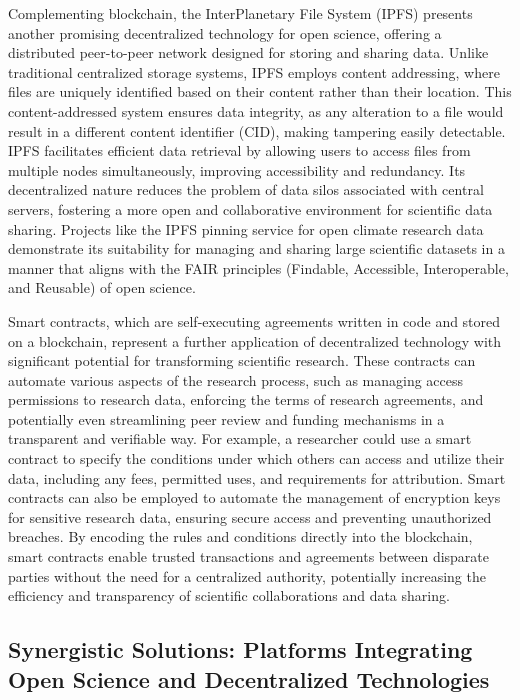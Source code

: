 Complementing blockchain, the InterPlanetary File System (IPFS) presents another promising decentralized technology for open science, offering a distributed peer-to-peer network designed for storing and sharing data. Unlike traditional centralized storage systems, IPFS employs content addressing, where files are uniquely identified based on their content rather than their location. This content-addressed system ensures data integrity, as any alteration to a file would result in a different content identifier (CID), making tampering easily detectable. IPFS facilitates efficient data retrieval by allowing users to access files from multiple nodes simultaneously, improving accessibility and redundancy. Its decentralized nature reduces the problem of data silos associated with central servers, fostering a more open and collaborative environment for scientific data sharing. Projects like the IPFS pinning service for open climate research data demonstrate its suitability for managing and sharing large scientific datasets in a manner that aligns with the FAIR principles (Findable, Accessible, Interoperable, and Reusable) of open science.

Smart contracts, which are self-executing agreements written in code and stored on a blockchain, represent a further application of decentralized technology with significant potential for transforming scientific research. These contracts can automate various aspects of the research process, such as managing access permissions to research data, enforcing the terms of research agreements, and potentially even streamlining peer review and funding mechanisms in a transparent and verifiable way. For example, a researcher could use a smart contract to specify the conditions under which others can access and utilize their data, including any fees, permitted uses, and requirements for attribution. Smart contracts can also be employed to automate the management of encryption keys for sensitive research data, ensuring secure access and preventing unauthorized breaches. By encoding the rules and conditions directly into the blockchain, smart contracts enable trusted transactions and agreements between disparate parties without the need for a centralized authority, potentially increasing the efficiency and transparency of scientific collaborations and data sharing.



\subsection{Synergistic Solutions: Platforms Integrating Open Science and Decentralized Technologies}

